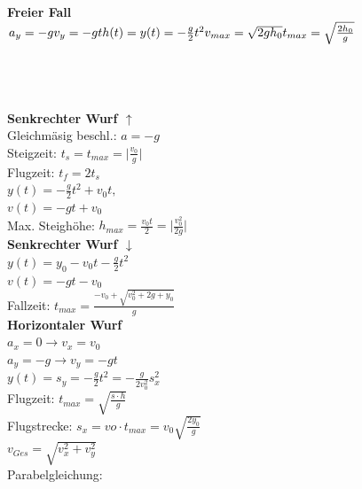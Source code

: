 	\begin{multicols}{3}
		\textbf{Freier Fall} \\
		$a_{y} = -g \\
		v_{y} = -gt \\
		h(t) = y(t) = -\frac{g}{2}t^2 \\
		v_{max} = \sqrt{2gh_0} \\
		t_{max} = \sqrt{\frac{2h_0}{g}}$ \\
		\\
		\\
		\\
	
		\columnbreak
		\textbf{Senkrechter Wurf $\uparrow$} \\
		Gleichmäsig beschl.: $a = -g$ \\
		Steigzeit: $t_{s} = t_{max} = \lvert{\frac{v_{0}}{g}}\rvert$ \\
		Flugzeit: $t_{f} = 2t_{s}$ \\
		$y(t) = -\frac{g}{2}t^2 + v_0 t, $\\
		$v(t) = -gt + v_0$ \\
		Max. Steighöhe: $h_{max} = \frac{v_{0}t}{2} = \lvert{\frac{v_{0}^2}{2g}}\rvert$ \\

		\textbf{Senkrechter Wurf $\downarrow$} \\
	
		$y(t) = y_0 - v_0t - \frac{g}{2}t^2$ \\
		$v(t) = -gt - v_0$ \\
		Fallzeit: $t_{max} = \frac{-v_{0} + \sqrt{v_0^2 + 2g + y_0}}{g}$ \\

		
	
		\columnbreak
		\textbf{Horizontaler Wurf} \\
		$a_{x} = 0 \rightarrow{} v_{x} = v_{0}$  \\
		$a_{y} = -g \rightarrow{} v_{y} = -gt$ \\
		$y(t) = s_{y} = -\frac{g}{2}t^2 = -\frac{g}{2v_{0}^2}s_{x}^2$ \\
		Flugzeit: $t_{max} = \sqrt{\frac{s \cdot h}{g}}$ \\
		Flugstrecke: $s_{x} = vo \cdot t_{max} = v_0 \sqrt{\frac{2y_0}{g}}$ \\
		$v_{Ges} = \sqrt{v_{x}^2 + v_{y}^2} $ \\
		Parabelgleichung:\\
	\end{multicols}
	
